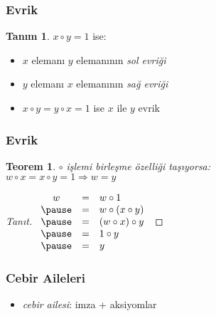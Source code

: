 \documentclass[dvipsnames]{beamer}
\theoremstyle{definition}
\newtheorem{tanim}[theorem]{Tanım}
\theoremstyle{example}
\theoremstyle{plain}
\newtheorem{teorem}[theorem]{Teorem}
\begin{document}
\begin{frame}
  \frametitle{Evrik}

  \begin{tanim}
    $x \circ y = 1$ ise:

    \begin{itemize}
      \item $x$ elemanı $y$ elemanının \emph{sol evriği}
      \item $y$ elemanı $x$ elemanının \emph{sağ evriği}

      \pause
      \medskip
      \item $x \circ y = y \circ x = 1$ ise
        $x$ ile $y$ \alert{evrik}
    \end{itemize}
  \end{tanim}
\end{frame}

\begin{frame}
  \frametitle{Evrik}

  \begin{teorem}
    $\circ$ işlemi birleşme özelliği taşıyorsa:\\
    $w \circ x = x \circ y = 1 \Rightarrow w = y$
  \end{teorem}

  \pause
  \begin{proof}[Tanıt]
    $\begin{array}{ccl}
      w & = & w \circ 1\\ \pause
        & = & w \circ (x \circ y)\\ \pause
        & = & (w \circ x) \circ y\\ \pause
        & = & 1 \circ y\\ \pause
        & = & y
    \end{array}$
  \end{proof}
\end{frame}

\begin{frame}
  \frametitle{Cebir Aileleri}

  \begin{itemize}
    \item \emph{cebir ailesi}: imza + aksiyomlar
  \end{itemize}
\end{frame}
\end{document}
